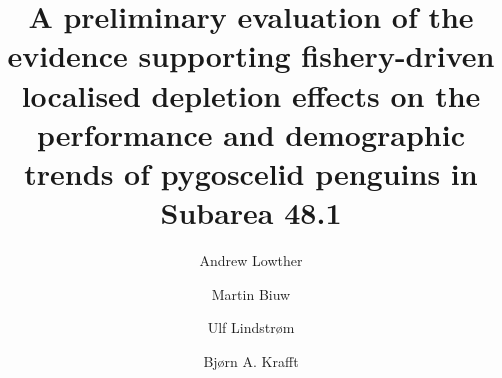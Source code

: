 \documentclass[]{elsarticle} %
\begin{document}
\begin{frontmatter}

  \title{A preliminary evaluation of the evidence supporting fishery-driven
localised depletion effects on the performance and demographic trends of
pygoscelid penguins in Subarea 48.1}
    \author[Norwegian Polar Institute]{Andrew Lowther}
    \author[Institute of Marine Research (Tromsø)]{Martin Biuw}
    \author[Institute of Marine Research (Tromsø)]{Ulf Lindstrøm}
    \author[Institute of Marine Research (Bergen)]{Bjørn A. Krafft}
      \address[Norwegian Polar Institute]{Norwegian Polar Institute, Research Department, Fram Centre, Hjalmar
Johansensgata 14, Tromsø, Norway, 9297}
    \address[Institute of Marine Research (Tromsø)]{Institute of Marine Research, Tromsø 9296, Norway}
    \address[Institute of Marine Research (Bergen)]{Institute of Marine Research, Nordnesgaten 50, 5005 Bergen, Norway}
  

\end{frontmatter}
\end{document}
